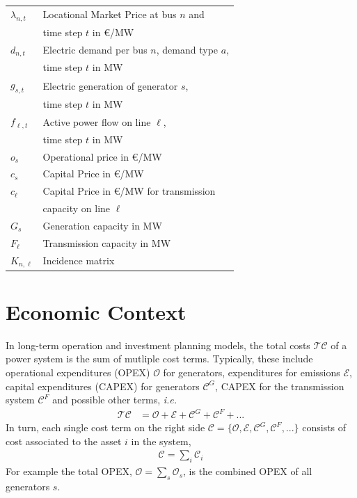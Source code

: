 \documentclass[11pt,twocolumn]{article}
\newcommand{\ie}{\textit{i.e.} }
\newcommand{\vpad}{\vspace{1mm}}
\newcommand{\generation}{g_{s,t}}
\newcommand{\capacitygeneration}{G_{s}}
\newcommand{\capacityflow}{F_{\ell}}
\newcommand{\capitalpricegeneration}{c_{s}}
\newcommand{\capitalpriceflow}{c_{\ell}}
\newcommand{\operationalpricegeneration}{o_{s}}
\newcommand{\demand}[1][n]{d_{#1,t}}
\newcommand{\incidence}[1][n]{K_{#1,\ell}}
\newcommand{\lmp}[1][n]{\lambda_{#1,t}}
\newcommand{\flow}{f_{\ell,t}}
\newcommand{\totalcost}{\mathcal{TC}}
\newcommand{\cost}{\mathcal{C}}
\newcommand{\opexgeneration}{\mathcal{O}}
\newcommand{\capexgeneration}{\mathcal{C}^G}
\newcommand{\capexflow}{\mathcal{C}^F}
\newcommand{\emissioncost}{\mathcal{E}}
\begin{document}
\begin{table}[h]
    \centering
    \begin{tabular}{ll}
        $\lmp$ & Locational Market Price at bus $n$ and  \\ & time step $t$ in \euro/MW \vpad \\
        $\demand$ & Electric demand per bus $n$, demand type $a$, \\ & time step $t$ in MW  \vpad \\
        $\generation$ & Electric generation of generator $s$, \\ & time step $t$  in MW \vpad \\
        $\flow$ & Active power flow on line $\ell$, \\ & time step $t$ in MW   \vpad \\
        $\operationalpricegeneration$ & Operational price in \euro/MW \vpad \\
        $\capitalpricegeneration$ & Capital Price in \euro/MW \vpad \\
        $\capitalpriceflow$  & Capital Price in \euro/MW for transmission \\ & capacity on line $\ell$  \vpad \\
        $\capacitygeneration$ & Generation capacity in MW \vpad \\
        $\capacityflow$ & Transmission capacity in MW \vpad \\
        $\incidence$ & Incidence matrix \vpad 
    \end{tabular}
\end{table}

\section{Economic Context}

In long-term operation and investment planning models, the total costs $\totalcost$ of a power system is the sum of mutliple cost terms. Typically, these include operational expenditures (OPEX) $\opexgeneration$ for generators, expenditures for emissions $\emissioncost$, capital expenditures (CAPEX) for generators $\capexgeneration$, CAPEX for the transmission system $\capexflow$ and possible other terms, \ie
\begin{align}
\totalcost &= \opexgeneration + \emissioncost +  \capexgeneration +  \capexflow + ...
\label{eq:total_cost_terms}
\end{align}
In turn, each single cost term on the right side $\mathcal{C} = \{\opexgeneration, \emissioncost, \capexgeneration, \capexflow, ...\}$ consists of cost associated to the asset $i$ in the system, 
\begin{align}
    \cost = \sum_i \cost_i
    \label{eq:asset_costs}
\end{align} 
For example the total OPEX, $\opexgeneration = \sum_s \opexgeneration_s$, is the combined OPEX of all generators $s$.
\end{document}
